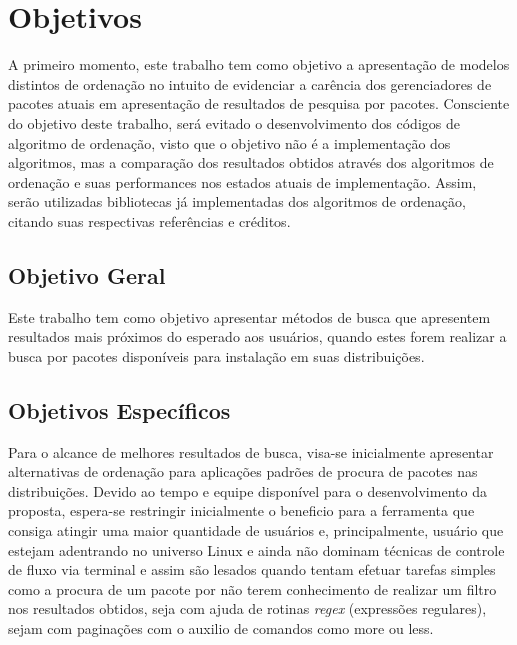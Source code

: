 \chapter{\nmu Objetivos}
\label{cha:objetivos}

A primeiro momento, este trabalho tem como objetivo a apresentação de modelos distintos de ordenação no intuito de evidenciar a carência dos gerenciadores de pacotes atuais em apresentação de resultados de pesquisa por pacotes. Consciente do objetivo deste trabalho, será evitado o desenvolvimento dos códigos de algoritmo de ordenação, visto que o objetivo não é a implementação dos algoritmos, mas a comparação dos resultados obtidos através dos algoritmos de ordenação e suas performances nos estados atuais de implementação. Assim, serão utilizadas bibliotecas já implementadas dos algoritmos de ordenação, citando suas respectivas referências e créditos.

\section{Objetivo Geral}

Este trabalho tem como objetivo apresentar  métodos de busca que apresentem resultados mais próximos do esperado aos usuários, quando estes forem realizar a busca por pacotes disponíveis para instalação em suas distribuições.

\section{Objetivos Específicos}

Para o alcance de melhores resultados de busca, visa-se inicialmente apresentar alternativas de ordenação para  aplicações padrões de procura de pacotes nas distribuições. Devido ao tempo e equipe disponível para o desenvolvimento da proposta, espera-se restringir inicialmente o beneficio para a ferramenta que consiga atingir uma maior quantidade de usuários e, principalmente, usuário que estejam adentrando no universo Linux e ainda não dominam técnicas de controle de fluxo via terminal e assim são lesados quando tentam efetuar tarefas simples como a procura de um pacote por não terem conhecimento de realizar um filtro nos resultados obtidos, seja com ajuda de rotinas \textit{regex} (expressões regulares), sejam com paginações com o auxilio de comandos como {\code more} ou {\code less}.

